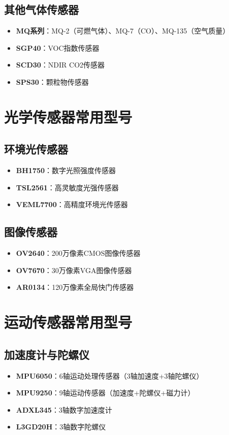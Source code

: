 \documentclass[12pt,UTF8]{ctexbook}
\begin{document}
\subsection{其他气体传感器}
\begin{itemize}[leftmargin=2cm]
	\item \textbf{MQ系列}：MQ-2（可燃气体）、MQ-7（CO）、MQ-135（空气质量）
	\item \textbf{SGP40}：VOC指数传感器
	\item \textbf{SCD30}：NDIR CO2传感器
	\item \textbf{SPS30}：颗粒物传感器
\end{itemize}

\section{光学传感器常用型号}
\subsection{环境光传感器}
\begin{itemize}[leftmargin=2cm]
	\item \textbf{BH1750}：数字光照强度传感器
	\item \textbf{TSL2561}：高灵敏度光强传感器
	\item \textbf{VEML7700}：高精度环境光传感器
\end{itemize}

\subsection{图像传感器}
\begin{itemize}[leftmargin=2cm]
	\item \textbf{OV2640}：200万像素CMOS图像传感器
	\item \textbf{OV7670}：30万像素VGA图像传感器
	\item \textbf{AR0134}：120万像素全局快门传感器
\end{itemize}

\section{运动传感器常用型号}
\subsection{加速度计与陀螺仪}
\begin{itemize}[leftmargin=2cm]
	\item \textbf{MPU6050}：6轴运动处理传感器（3轴加速度+3轴陀螺仪）
	\item \textbf{MPU9250}：9轴运动传感器（加速度+陀螺仪+磁力计）
	\item \textbf{ADXL345}：3轴数字加速度计
	\item \textbf{L3GD20H}：3轴数字陀螺仪
\end{itemize}
\end{document}
